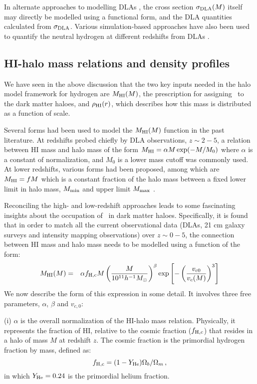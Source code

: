 In alternate approaches to modelling DLAs \cite{villaescusa2018}, the cross section $\sigma_{\rm DLA} (M)$ itself may directly be modelled using a functional form, and the DLA quantities calculated from $\sigma_{\rm DLA}$. Various simulation-based approaches have also been used to quantify the neutral hydrogen at different redshifts from DLAs \cite{pontzen2008, bird2014}.


\subsection{HI-halo mass relations and density profiles}
\label{sec:analytical}
We have seen in the above discussion that the two key inputs needed in the halo model framework for hydrogen are $M_{\rm HI}(M)$, the prescription for
assigning \HI\ to the dark matter haloes, and $\rho_{\rm HI}(r)$, which describes how this mass is distributed as a function of scale.  

Several forms had been used to model the $M_{\rm HI}(M)$ function in the past literature. At redshifts probed chiefly by DLA observations, $z \sim 2-5$, a relation between HI mass and halo mass of the form 
$M_{\rm HI} = \alpha M \exp(-M/M_0)$
where $\alpha$ is a constant of normalization, and $M_0$ is a lower mass cutoff was commonly used\cite{barnes2014}. 
At lower redshifts, various forms had been proposed, among which are $M_{\rm HI} = f M$ which is a constant fraction of the halo mass between a fixed lower limit in halo mass, $M_{\rm min}$ and upper limit $M_{\rm max}$ \cite{bagla2010}. 

Reconciling the high- and low-redshift approaches \cite{hptrcar2016} leads to some fascinating insights about the occupation of \HI\ in dark matter haloes. Specifically, it is found that in order to match all the current observational data (DLAs, 21 cm galaxy surveys and intensity mapping observations) over $z \sim 0-5$, the connection between HI mass and halo mass needs to be modelled using a function of the form:
\begin{eqnarray}
M_{\rm HI} (M) &=& \alpha f_{\rm H,c} M \left(\frac{M}{10^{11} h^{-1} M_{\odot}}\right)^{\beta} \exp\left[-\left(\frac{v_{c0}}{v_c(M)}\right)^3\right] \nonumber \\
\end{eqnarray}
We now describe the form of this expression in some detail. 
It involves three free parameters, $\alpha$, $\beta$ and $v_{c,0}$:

(i) $\alpha$ is the  overall normalization of the HI-halo mass relation. Physically, it represents the fraction of HI, relative to the cosmic fraction ($f_{\rm H,c}$) that resides in a halo of mass $M$ at redshift $z$. The cosmic fraction is the primordial hydrogen fraction by mass, defined as:
\begin{equation}
f_{\rm H,c} = (1 - Y_{\rm He}) \Omega_b/\Omega_m \, ,
\label{fhc}
\end{equation}
in which $Y_{\rm He} = 0.24$ is the primordial helium fraction.

